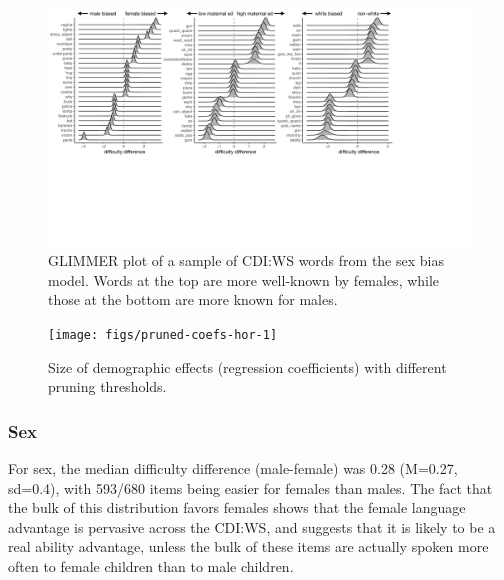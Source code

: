 \documentclass[10pt, letterpaper]{article}
\newenvironment{CodeChunk}{}{}
\begin{document}
\begin{CodeChunk}
\begin{figure}[h]

{\centering \includegraphics[width=\linewidth]{figs/smGLIMMER_combo} 

}

\caption[GLIMMER plot of a sample of CDI:WS words from the sex bias model]{GLIMMER plot of a sample of CDI:WS words from the sex bias model. Words at the top are more well-known by females, while those at the bottom are more known for males.}\label{fig:glimmer-combo}
\end{figure}
\end{CodeChunk}

\begin{CodeChunk}
\begin{figure}[h]

{\centering \texttt{[image: figs/pruned-coefs-hor-1]} 

}

\caption[Size of demographic effects (regression coefficients) with different pruning thresholds]{Size of demographic effects (regression coefficients) with different pruning thresholds.}\label{fig:pruned-coefs-hor}
\end{figure}
\end{CodeChunk}

\hypertarget{sex}{%
\subsubsection{Sex}\label{sex}}

For sex, the median difficulty difference (male-female) was 0.28
(M=0.27, sd=0.4), with 593/680 items being easier for females than
males. The fact that the bulk of this distribution favors females shows
that the female language advantage is pervasive across the CDI:WS, and
suggests that it is likely to be a real ability advantage, unless the
bulk of these items are actually spoken more often to female children
than to male children.
\end{document}
